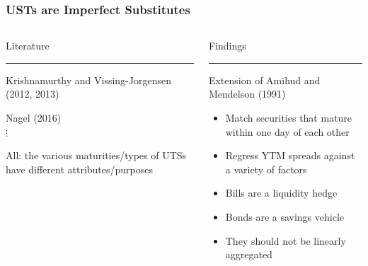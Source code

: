\documentclass[11pt, handout, aspectratio=169]{beamer}
\newenvironment{wideitemize}{\itemize\addtolength{\itemsep}{10pt}}{\enditemize}
\begin{document}
\begin{frame}
	\label{slide:UST_Market}
	\frametitle{USTs are Imperfect Substitutes}
	\vspace{-2em}
	\begin{columns}[t]
		\begin{column}{0.49\textwidth}
			\begin{center}
				\Large \textcolor{WeberPurple}{Literature}
			\end{center} \vspace{-.2in}
			{\color{WeberPurple}\rule{\linewidth}{2pt}}
			\begin{wideitemize}
				\item Krishnamurthy and Vissing-Jorgensen (2012, 2013)
				\item Nagel (2016) \\ $\vdots$
				\item All: the various maturities/types of UTSs have different attributes/purposes
			\end{wideitemize}
		\end{column}
		\hfill
		\begin{column}{0.49\textwidth}
			\begin{center}
				\Large \textcolor{WeberPurple}{Findings}
			\end{center} \vspace{-.2in}
			{\color{WeberPurple}\rule{\linewidth}{2pt}}
			\begin{wideitemize}
				\item Extension of Amihud and Mendelson (1991)
				\begin{itemize}
					\item Match securities that mature within one day of each other
					\item Regress YTM spreads against a variety of factors
				\end{itemize}
				\item {\bf \color{WeberPurple}{Contribution}}
				\begin{itemize}
					\item Bills are a liquidity hedge
					\item Bonds are a savings vehicle
					\item They should not be linearly aggregated 
				\end{itemize}
			\end{wideitemize}
		\end{column}
	\end{columns}
	\vfill
	\hfill \hyperlink{slide:Model}{}
\end{frame}
\end{document}
